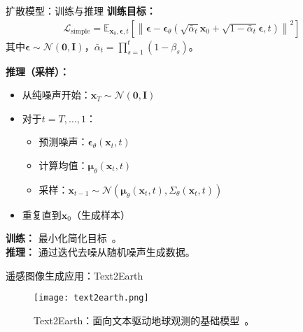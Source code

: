   \begin{refsection}
  \begin{frame}{扩散模型：训练与推理}
    \footnotesize
    \textbf{训练目标：}
    \begin{align*}
      \mathcal{L}_{\mathrm{simple}} = \mathbb{E}_{\mathbf{x}_0, \boldsymbol{\epsilon}, t} \left[ \left\| \boldsymbol{\epsilon} - \boldsymbol{\epsilon}_\theta(\sqrt{\bar{\alpha}_t}\mathbf{x}_0 + \sqrt{1-\bar{\alpha}_t}\boldsymbol{\epsilon}, t) \right\|^2 \right]
    \end{align*}
    其中$\boldsymbol{\epsilon} \sim \mathcal{N}(\mathbf{0}, \mathbf{I})$，$\bar{\alpha}_t = \prod_{s=1}^t (1-\beta_s)$。
  
    \vspace{0.5em}
    \textbf{推理（采样）：}
    \begin{itemize}
      \item 从纯噪声开始：$\mathbf{x}_T \sim \mathcal{N}(\mathbf{0}, \mathbf{I})$
      \item 对于$t = T, \ldots, 1$：
        \begin{itemize}
          \item 预测噪声：$\boldsymbol{\epsilon}_\theta(\mathbf{x}_t, t)$
          \item 计算均值：$\boldsymbol{\mu}_\theta(\mathbf{x}_t, t)$
          \item 采样：$\mathbf{x}_{t-1} \sim \mathcal{N}(\boldsymbol{\mu}_\theta(\mathbf{x}_t, t), \Sigma_\theta(\mathbf{x}_t, t))$
        \end{itemize}
      \item 重复直到$\mathbf{x}_0$（生成样本）
    \end{itemize}
  
    \vspace{0.5em}
    \scriptsize
    \textbf{训练：} 最小化简化目标~\parencite{ho2020denoising}。\\
    \textbf{推理：} 通过迭代去噪从随机噪声生成数据。
    \bottomleftrefs
  \end{frame}
  \end{refsection}
  
  
  \begin{refsection}
    \begin{frame}{遥感图像生成应用：Text2Earth}
      \begin{figure}
        \centering
        \texttt{[image: text2earth.png]}
        \caption[]{\scriptsize Text2Earth：面向文本驱动地球观测的基础模型~\parencite{text2earth2025}。}
      \end{figure}
      \bottomleftrefs
    \end{frame}
  \end{refsection}
  
